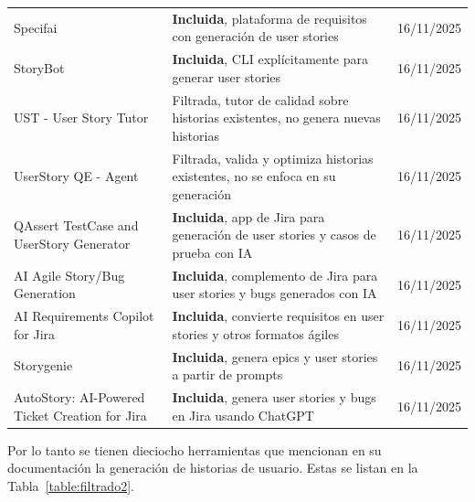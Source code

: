 \begin{center}
\begin{longtable}{|p{6.5cm}|p{4cm}|p{1.8cm}|}
Specifai & \textbf{Incluida}, plataforma de requisitos con generación de user stories & 16/11/2025 \\
StoryBot & \textbf{Incluida}, CLI explícitamente para generar user stories & 16/11/2025 \\
UST - User Story Tutor & Filtrada, tutor de calidad sobre historias existentes, no genera nuevas historias & 16/11/2025 \\
UserStory QE - Agent & Filtrada, valida y optimiza historias existentes, no se enfoca en su generación & 16/11/2025 \\
QAssert TestCase and UserStory Generator & \textbf{Incluida}, app de Jira para generación de user stories y casos de prueba con IA & 16/11/2025 \\
AI Agile Story/Bug Generation & \textbf{Incluida}, complemento de Jira para user stories y bugs generados con IA & 16/11/2025 \\
AI Requirements Copilot for Jira & \textbf{Incluida}, convierte requisitos en user stories y otros formatos ágiles & 16/11/2025 \\
Storygenie & \textbf{Incluida}, genera epics y user stories a partir de prompts & 16/11/2025 \\
AutoStory: AI-Powered Ticket Creation for Jira & \textbf{Incluida}, genera user stories y bugs en Jira usando ChatGPT & 16/11/2025 \\
\hline
\end{longtable}
\end{center}


Por lo tanto se tienen dieciocho herramientas que mencionan en su documentación la generación de historias de usuario. Estas se listan en la Tabla~\ref{table:filtrado2}.

